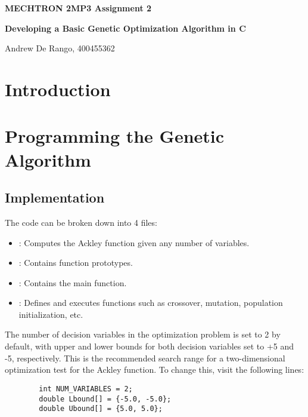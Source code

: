 \documentclass[12pt]{article}
\begin{document}
	
	\justifying
	
	\begin{center}
		\textbf{{\large MECHTRON 2MP3 Assignment 2}}
		
		\textbf{Developing a Basic Genetic Optimization Algorithm in C} 
		
		Andrew De Rango, 400455362
	\end{center}
	

	
	
	
	\section{Introduction}
	
	
	\section{Programming the Genetic Algorithm}

	\subsection{Implementation}
	
	The code can be broken down into 4 files:
	
	\begin{itemize}
		\item {}: Computes the Ackley function given any number of variables.
		\item {}: Contains function prototypes.
		\item {}: Contains the main function.
		\item {}: Defines and executes functions such as crossover, mutation, population initialization, etc.
	\end{itemize}
	
	The number of decision variables in the optimization problem is set to 2 by default, with upper and lower bounds for both decision variables set to +5 and -5, respectively. This is the recommended search range for a two-dimensional optimization test for the Ackley function. To change this, visit the following lines:
	
	\begin{lstlisting}
		int NUM_VARIABLES = 2;
		double Lbound[] = {-5.0, -5.0};
		double Ubound[] = {5.0, 5.0};
	\end{lstlisting}
	
\end{document}
